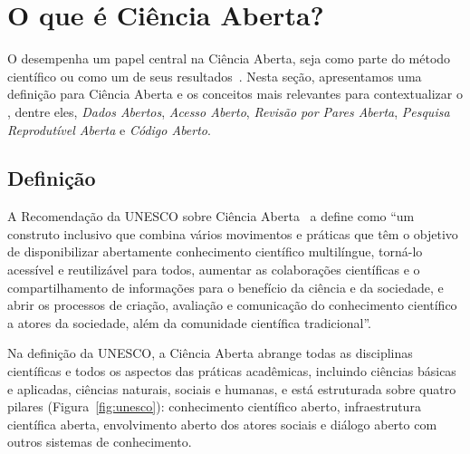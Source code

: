 \section{O que é Ciência Aberta?}
\label{section:openscience}



O \RSw desempenha um papel central na Ciência Aberta, seja como parte do método científico ou como um de seus resultados~\cite{training:handbook}.
Nesta seção, apresentamos uma definição para Ciência Aberta e os conceitos mais relevantes para contextualizar o \RS, dentre eles, \textit{Dados Abertos}, \textit{Acesso Aberto}, \textit{Revisão por Pares Aberta}, \textit{Pesquisa Reprodutível Aberta} e \textit{Código Aberto}. 

\subsection{Definição}

A Recomendação da UNESCO sobre Ciência Aberta~\cite{unesco:2021} a define como  ``um  construto  inclusivo  que  combina  vários  movimentos  e  práticas  que  têm  o  objetivo  de   disponibilizar   abertamente   conhecimento   científico   multilíngue,   torná-lo  acessível  e  reutilizável  para  todos,  aumentar  as  colaborações  científicas  e  o  compartilhamento de informações para o benefício da ciência e da sociedade, e abrir os processos de criação, avaliação e comunicação do conhecimento científico a atores da sociedade, além da comunidade científica tradicional''. 

Na definição da UNESCO, a Ciência Aberta abrange todas as disciplinas científicas e todos os aspectos das práticas acadêmicas, incluindo ciências básicas e aplicadas, ciências naturais, sociais e humanas,
e está estruturada sobre quatro pilares (Figura~\ref{fig:unesco}): 
conhecimento científico aberto, infraestrutura científica aberta,  envolvimento aberto dos atores sociais e diálogo aberto com outros sistemas de conhecimento.

